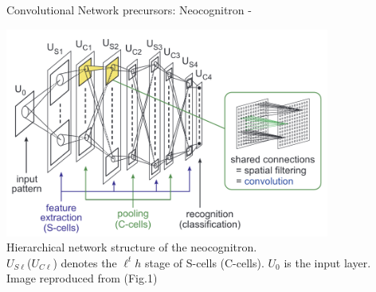 \begin{frame}[t,allowframebreaks]{Convolutional Network precursors: Neocognitron -}
    \begin{center}
        \includegraphics[width=0.80\textwidth]
           {./images/neocognitron/fukushima19_hierarchical_network_structure_01.png}\\
        {\scriptsize 
        Hierarchical network structure of the \gls{neocognitron}.\\
        $U_{S\ell}$($U_{C\ell}$) denotes the $\ell^th$ stage of S-cells (C-cells).
        $U_0$ is the input layer.\\
        \color{col:attribution} 
        Image reproduced from \cite{Fukushima:2019nc} (Fig.1)}\\
    \end{center}

    \framebreak


\end{frame}
